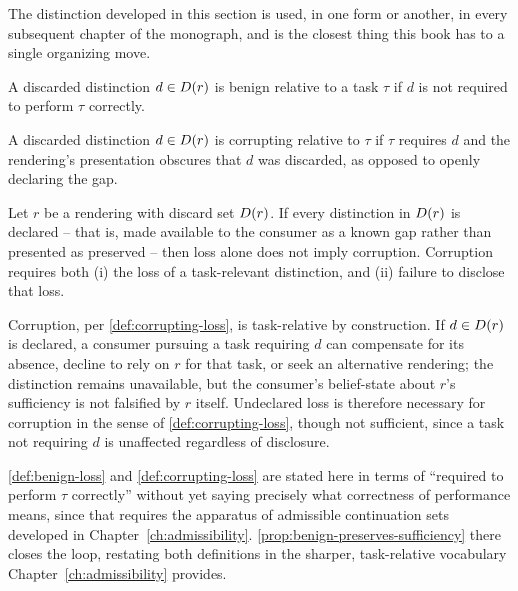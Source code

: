 The distinction developed in this section is used, in one form or
another, in every subsequent chapter of the monograph, and is the closest
thing this book has to a single organizing move.

\begin{definition}
\label{def:benign-loss}
A discarded distinction $d \in D(r)$ is benign relative to a task
$\tau$ if $d$ is not required to perform $\tau$ correctly.
\end{definition}

\begin{definition}
\label{def:corrupting-loss}
A discarded distinction $d \in D(r)$ is corrupting relative to
$\tau$ if $\tau$ requires $d$ and the rendering's presentation obscures
that $d$ was discarded, as opposed to openly declaring the gap.
\end{definition}

\begin{proposition}
\label{prop:corruption-undeclared}
Let $r$ be a rendering with discard set $D(r)$. If every
distinction in $D(r)$ is declared -- that is, made available to the
consumer as a known gap rather than presented as preserved -- then loss
alone does not imply corruption. Corruption requires both (i) the loss of
a task-relevant distinction, and (ii) failure to disclose that loss.
\end{proposition}

\begin{proofsketch}
Corruption, per \cref{def:corrupting-loss}, is task-relative by
construction. If $d\in D(r)$ is declared, a consumer pursuing a task
requiring $d$ can compensate for its absence, decline to rely on $r$ for
that task, or seek an alternative rendering; the distinction remains
unavailable, but the consumer's belief-state about $r$'s sufficiency is
not falsified by $r$ itself. Undeclared loss is therefore necessary for
corruption in the sense of \cref{def:corrupting-loss}, though not
sufficient, since a task not requiring $d$ is unaffected regardless of
disclosure.
\end{proofsketch}

\cref{def:benign-loss} and \cref{def:corrupting-loss} are stated here in
terms of ``required to perform $\tau$ correctly'' without yet saying
precisely what correctness of performance means, since that requires the
apparatus of admissible continuation sets developed in
Chapter~\ref{ch:admissibility}. \cref{prop:benign-preserves-sufficiency}
there closes the loop, restating both definitions in the sharper,
task-relative vocabulary Chapter~\ref{ch:admissibility} provides.

